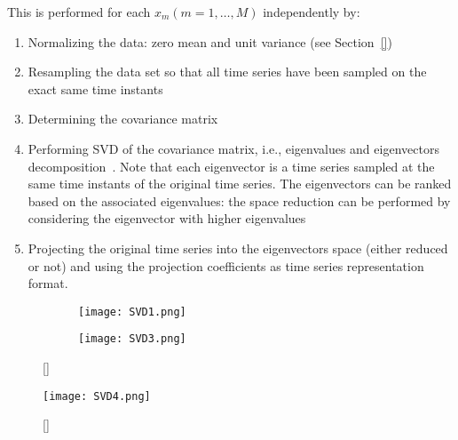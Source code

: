 This is performed for each $x_m (m=1,\ldots,M)$ independently by:
\begin{enumerate}
  \item Normalizing the data: zero mean and unit variance (see Section~\ref{})
  \item Resampling the data set so that all time series have been sampled on the exact same time instants
  \item Determining the covariance matrix
  \item Performing SVD of the covariance matrix, i.e., eigenvalues and eigenvectors decomposition~\cite{}. 
        Note that each eigenvector is a time series sampled at the same time instants of the original time series. 
        The eigenvectors can be ranked based on the associated eigenvalues: the space
        reduction can be performed by considering the eigenvector with higher eigenvalues 
  \item Projecting the original time series into the eigenvectors space (either reduced or not) and using the projection 
        coefficients as time series representation format.
\end{enumerate}
 
\begin{figure}
  \begin{subfigure}{.5\linewidth}
    \centering
    \texttt{[image: SVD1.png]}
  \end{subfigure}%
  \begin{subfigure}{.5\linewidth}
    \centering
    \texttt{[image: SVD3.png]}
  \end{subfigure}
  \caption{[]}
  \label{fig:svd}
\end{figure}  

\begin{figure}
    \centering
    \centerline{\texttt{[image: SVD4.png]}} 
    \caption{[]}
    \label{fig:SVDcumulative}
\end{figure} 
  
